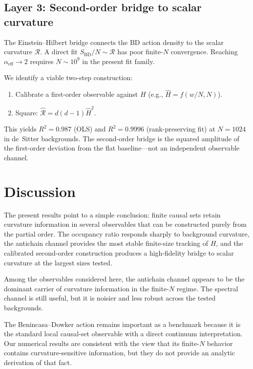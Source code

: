 \documentclass[12pt,a4paper]{article}
\newcommand{\SBD}{S_{\mathrm{BD}}}
\begin{document}
\subsection{Layer 3: Second-order bridge to scalar curvature}

The Einstein--Hilbert bridge connects the BD action density to the scalar
curvature $\mathcal{R}$.
A direct fit $\SBD/N \sim \mathcal{R}$ has poor finite-$N$ convergence.
Reaching $\alpha_{\mathrm{eff}}\to 2$ requires $N\sim 10^9$ in the present
fit family.

We identify a viable two-step construction:
\begin{enumerate}
\item Calibrate a first-order observable against $H$
  (e.g., $\hat{H} = f(w/N, N)$).
\item Square: $\hat{\mathcal{R}} = d(d-1)\hat{H}^2$.
\end{enumerate}

This yields $R^2 = 0.987$ (OLS) and $R^2 = 0.9996$ (rank-preserving fit)
at $N=1024$ in de~Sitter backgrounds.
The second-order bridge is the squared amplitude of the first-order deviation
from the flat baseline---not an independent observable channel.

\section{Discussion}

The present results point to a simple conclusion: finite causal sets retain
curvature information in several observables that can be constructed purely
from the partial order. The occupancy ratio responds sharply to background
curvature, the antichain channel provides the most stable finite-size tracking
of $H$, and the calibrated second-order construction produces a high-fidelity
bridge to scalar curvature at the largest sizes tested.

Among the observables considered here, the antichain channel appears to be the
dominant carrier of curvature information in the finite-$N$ regime. The spectral
channel is still useful, but it is noisier and less robust across the tested
backgrounds.

The Benincasa--Dowker action remains important as a benchmark because it is the
standard local causal-set observable with a direct continuum interpretation.
Our numerical results are consistent with the view that its finite-$N$ behavior
contains curvature-sensitive information, but they do not provide an analytic
derivation of that fact.
\end{document}
